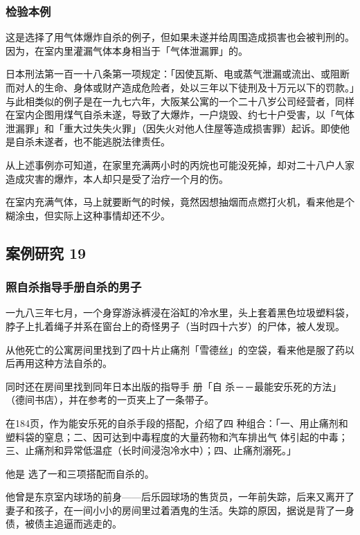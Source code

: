 \documentclass[UTF8]{ctexart}
\begin{document}
\subsubsection*{检验本例}

这是选择了用气体爆炸自杀的例子，但如果未遂并给周围造成损害也会被判刑的。
因为，在室内里灌漏气体本身相当于「气体泄漏罪」的。

日本刑法第一百一十八条第一项规定：「因使瓦斯、电或蒸气泄漏或流出、或阻断而对人的生命、身体或财产造成危险者，处以三年以下徒刑及十万元以下的罚款。」与此相类似的例子是在一九七六年，大阪某公寓的一个二十八岁公司经营者，同样在室内企图用煤气自杀未遂，导致了大爆炸，一户烧毁、约七十户受害，以「气体泄漏罪」和「重大过失失火罪」（因失火对他人住屋等造成损害罪）起诉。即使他是自杀未遂者，也不能逃脱法律责任。

从上述事例亦可知道，在家里充满两小时的丙烷也可能没死掉，却对二十八户人家造成灾害的爆炸，本人却只是受了治疗一个月的伤。

在室内充满气体，马上就要断气的时候，竟然因想抽烟而点燃打火机，看来他是个糊涂虫，但实际上这种事情却还不少。

\subsection{案例研究 19}

\subsubsection*{照自杀指导手册自杀的男子}

一九八三年七月，一个身穿游泳裤浸在浴缸的冷水里，头上套着黑色垃圾塑料袋，脖子上扎着绳子并系在窗台上的奇怪男子（当时四十六岁）的尸体，被人发现。

从他死亡的公寓房间里找到了四十片止痛剂「雪德丝」的空袋，看来他是服了药以后再用这种方法自杀的。

同时还在房间里找到同年日本出版的指导手
册「自
杀－－最能安乐死的方法」（德间书店），并在参考的一页夹上了一条带子。

在184页，作为能安乐死的自杀手段的搭配，介绍了四 种组合：「一、用止痛剂和塑料袋的窒息；二、因可达到中毒程度的大量药物和汽车排出气 体引起的中毒；三、止痛剂和异常低温症（长时间浸泡冷水中）；四、止痛剂溺死。」

他是 选了一和三项搭配而自杀的。 

他曾是东京室内球场的前身——后乐园球场的售货员，一年前失踪，后来又离开了妻子和孩子，在一间小小的房间里过着酒鬼的生活。失踪的原因，据说是背了一身债，被债主追逼而逃走的。
\end{document}
